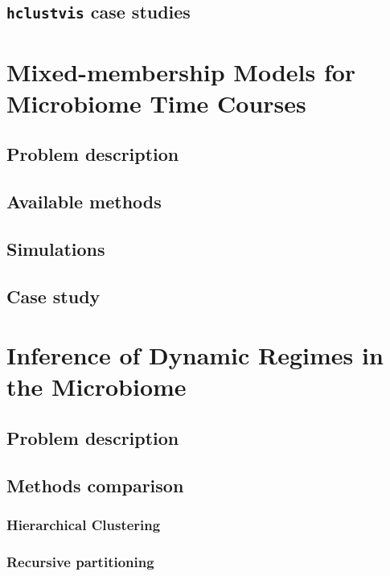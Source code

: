 \documentclass{report}
\begin{document}
\section{\texttt{hclustvis} case studies}

\chapter{Mixed-membership Models for Microbiome Time Courses}

\section{Problem description}

\section{Available methods}

\section{Simulations}

\section{Case study}

\chapter{Inference of Dynamic Regimes in the Microbiome}

\section{Problem description}

\section{Methods comparison}

\subsection{Hierarchical Clustering}

\subsection{Recursive partitioning}
\end{document}
